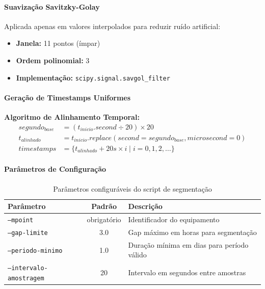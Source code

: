 \paragraph{Suavização Savitzky-Golay}

Aplicada apenas em valores interpolados para reduzir ruído artificial:
\begin{itemize}
    \item \textbf{Janela:} 11 pontos (ímpar)
    \item \textbf{Ordem polinomial:} 3
    \item \textbf{Implementação:} \texttt{scipy.signal.savgol\_filter}
\end{itemize}

\paragraph{Geração de Timestamps Uniformes}

\textbf{Algoritmo de Alinhamento Temporal:}
\begin{align}
segundo_{base} &= (t_{inicio}.second \div 20) \times 20 \\
t_{alinhado} &= t_{inicio}.replace(second=segundo_{base}, microsecond=0) \\
timestamps &= \{t_{alinhado} + 20s \times i \mid i = 0, 1, 2, \dots\}
\end{align}

\paragraph{Parâmetros de Configuração}

\begin{table}[H]
\centering
\caption{Parâmetros configuráveis do script de segmentação}
\begin{tabular}{|l|c|l|}
\hline
\textbf{Parâmetro} & \textbf{Padrão} & \textbf{Descrição} \\
\hline
\texttt{--mpoint} & obrigatório & Identificador do equipamento \\
\texttt{--gap-limite} & 3.0 & Gap máximo em horas para segmentação \\
\texttt{--periodo-minimo} & 1.0 & Duração mínima em dias para período válido \\
\texttt{--intervalo-amostragem} & 20 & Intervalo em segundos entre amostras \\
\hline
\end{tabular}
\end{table}

